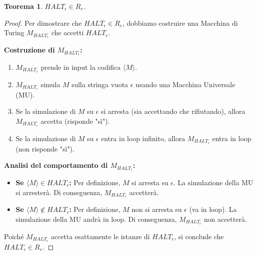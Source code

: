 \documentclass[a4paper, 11pt]{book} %
\newtheorem{theorem}{Teorema}[section]
\theoremstyle{definition}
\begin{document}
\begin{theorem}
$HALT_\epsilon \in R_e$.
\end{theorem}
\begin{proof}
Per dimostrare che $HALT_\epsilon \in R_e$, dobbiamo costruire una Macchina di Turing $M_{HALT_\epsilon}$ che accetti $HALT_\epsilon$.

\textbf{Costruzione di $M_{HALT_\epsilon}$:}
\begin{enumerate}
    \item $M_{HALT_\epsilon}$ prende in input la codifica $\langle M \rangle$.
    \item $M_{HALT_\epsilon}$ simula $M$ sulla stringa vuota $\epsilon$ usando una Macchina Universale (MU).
    \item Se la simulazione di $M$ su $\epsilon$ si arresta (sia accettando che rifiutando), allora $M_{HALT_\epsilon}$ accetta (risponde "sì").
    \item Se la simulazione di $M$ su $\epsilon$ entra in loop infinito, allora $M_{HALT_\epsilon}$ entra in loop (non risponde "sì").
\end{enumerate}
\textbf{Analisi del comportamento di $M_{HALT_\epsilon}$:}
\begin{itemize}
    \item \textbf{Se $\langle M \rangle \in HALT_\epsilon$:}
    Per definizione, $M$ si arresta su $\epsilon$. La simulazione della MU si arresterà. Di conseguenza, $M_{HALT_\epsilon}$ accetterà.
    \item \textbf{Se $\langle M \rangle \notin HALT_\epsilon$:}
    Per definizione, $M$ non si arresta su $\epsilon$ (va in loop). La simulazione della MU andrà in loop. Di conseguenza, $M_{HALT_\epsilon}$ non accetterà.
\end{itemize}
Poiché $M_{HALT_\epsilon}$ accetta esattamente le istanze di $HALT_\epsilon$, si conclude che $HALT_\epsilon \in R_e$.
\end{proof}
\end{document}
